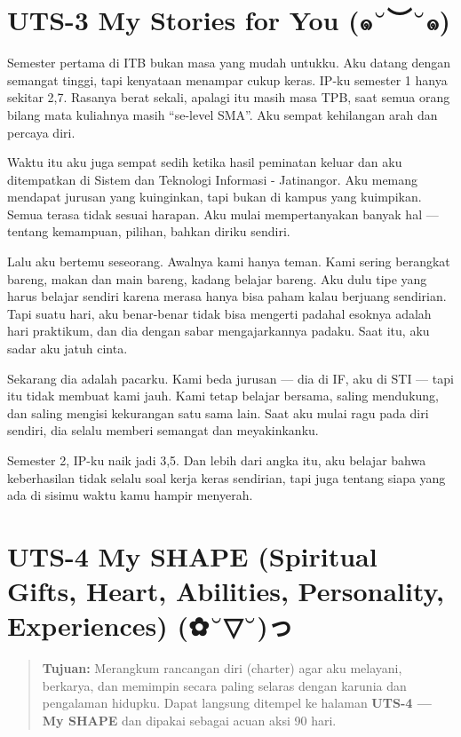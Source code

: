 \documentclass[
  letterpaper,
  DIV=11,
  numbers=noendperiod]{scrreprt}
\begin{document}
\chapter{UTS-3 My Stories for You
(๑˘︶˘๑)}\label{uts-3-my-stories-for-you-uxe51uxe51}

Semester pertama di ITB bukan masa yang mudah untukku. Aku datang dengan
semangat tinggi, tapi kenyataan menampar cukup keras. IP-ku semester 1
hanya sekitar 2,7. Rasanya berat sekali, apalagi itu masih masa TPB,
saat semua orang bilang mata kuliahnya masih ``se-level SMA''. Aku
sempat kehilangan arah dan percaya diri.

Waktu itu aku juga sempat sedih ketika hasil peminatan keluar dan aku
ditempatkan di Sistem dan Teknologi Informasi - Jatinangor. Aku memang
mendapat jurusan yang kuinginkan, tapi bukan di kampus yang kuimpikan.
Semua terasa tidak sesuai harapan. Aku mulai mempertanyakan banyak hal
--- tentang kemampuan, pilihan, bahkan diriku sendiri.

Lalu aku bertemu seseorang. Awalnya kami hanya teman. Kami sering
berangkat bareng, makan dan main bareng, kadang belajar bareng. Aku dulu
tipe yang harus belajar sendiri karena merasa hanya bisa paham kalau
berjuang sendirian. Tapi suatu hari, aku benar-benar tidak bisa mengerti
padahal esoknya adalah hari praktikum, dan dia dengan sabar
mengajarkannya padaku. Saat itu, aku sadar aku jatuh cinta.

Sekarang dia adalah pacarku. Kami beda jurusan --- dia di IF, aku di STI
--- tapi itu tidak membuat kami jauh. Kami tetap belajar bersama, saling
mendukung, dan saling mengisi kekurangan satu sama lain. Saat aku mulai
ragu pada diri sendiri, dia selalu memberi semangat dan meyakinkanku.

Semester 2, IP-ku naik jadi 3,5. Dan lebih dari angka itu, aku belajar
bahwa keberhasilan tidak selalu soal kerja keras sendirian, tapi juga
tentang siapa yang ada di sisimu waktu kamu hampir menyerah.


\chapter{UTS-4 My SHAPE (Spiritual Gifts, Heart, Abilities, Personality,
Experiences)
(✿˘▽˘)っ}\label{uts-4-my-shape-spiritual-gifts-heart-abilities-personality-experiences-ux3063}

\begin{quote}
\textbf{Tujuan:} Merangkum rancangan diri (charter) agar aku melayani,
berkarya, dan memimpin secara paling selaras dengan karunia dan
pengalaman hidupku. Dapat langsung ditempel ke halaman \textbf{UTS-4 ---
My SHAPE} dan dipakai sebagai acuan aksi 90 hari.
\end{quote}
\end{document}
